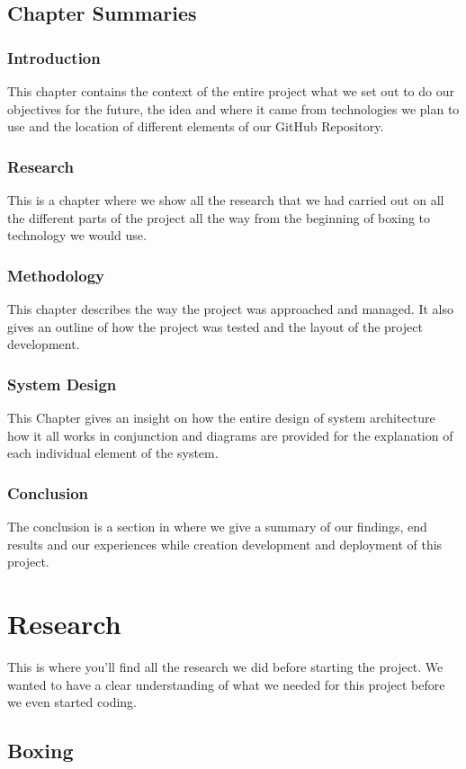 \documentclass[a4paper,12pt,twoside]{report}
\begin{document}
\section{Chapter Summaries}
\subsection{Introduction}
This chapter contains the context of the entire project what we set out to do our objectives for the future, the idea and where it came from technologies we plan to use and the location of different elements of our GitHub Repository. 

\subsection{Research}
This is a chapter where we show all the research that we had carried out on all the different parts of the project all the way from the beginning of boxing to technology we would use.
\subsection{Methodology}
This chapter describes the way the project was approached and managed. It also gives an outline of how the project was tested and the layout of the project development.
\subsection{System Design}
This Chapter gives an insight on how the entire design of system architecture how it all works in conjunction and diagrams are provided for the explanation of each individual element of the system. 
\subsection{Conclusion}
The conclusion is a section in where we give a summary of our findings, end results and our experiences while creation development and deployment of this project.


\chapter{Research}
This is where you'll find all the research we did before starting the project. We wanted to have a clear understanding of what we needed for this project before we even started coding. 
\section{Boxing}
\end{document}
